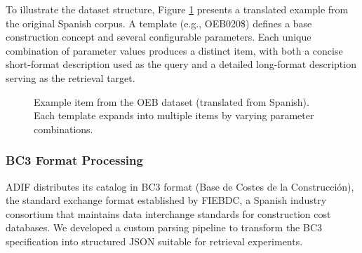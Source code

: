 \documentclass[preprint,12pt]{elsarticle}
\begin{document}
To illustrate the dataset structure, Figure \ref{fig:oeb_example} presents a translated example from the original Spanish corpus. A template (e.g., OEB020\$) defines a base construction concept and several configurable parameters. Each unique combination of parameter values produces a distinct item, with both a concise short-format description used as the query and a detailed long-format description serving as the retrieval target.

\begin{figure}[ht]
\centering
\small
{}
\caption{Example item from the OEB dataset (translated from Spanish). Each template expands into multiple items by varying parameter combinations.}
\label{fig:oeb_example}
\end{figure}

\subsubsection{BC3 Format Processing}

ADIF distributes its catalog in BC3 format (Base de Costes de la Construcción), the standard exchange format established by FIEBDC, a Spanish industry consortium that maintains data interchange standards for construction cost databases. We developed a custom parsing pipeline to transform the BC3 specification into structured JSON suitable for retrieval experiments.
\end{document}
